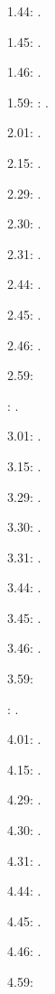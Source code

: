 \documentclass[italian]{article}
\begin{document}
1.44:   .

1.45:   .

1.46:   .

1.59:   
:  .

2.01:   . 

2.15:   . 

2.29:   . 

2.30:   .

2.31:   .

2.44:   .

2.45:   .

2.46:   .

2.59:   

:  .

3.01:   . 

3.15:   . 

3.29:   . 

3.30:   .

3.31:   .

3.44:   .

3.45:   .

3.46:   .

3.59:   

:  .

4.01:   . 

4.15:   . 

4.29:   . 

4.30:   .

4.31:   .

4.44:   .

4.45:   .

4.46:   .

4.59:   
\end{document}
